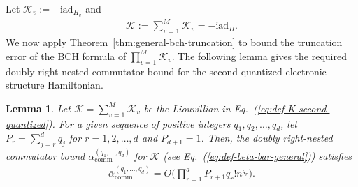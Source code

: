 \documentclass[11pt]{article}
\newtheorem{lemma}{Lemma}
\newcommand{\eq}[1]{(\ref{eq:#1})}
\newcommand{\thm}[1]{\hyperref[thm:#1]{Theorem~\ref*{thm:#1}}}
\renewcommand{\i}{\mathrm{i}}
\newcommand{\ad}{\mathrm{ad}}
\renewcommand{\comm}{\mathrm{comm}}
\newcommand{\mc}{\mathcal}
\begin{document}
Let $\mc{K}_v:=-\i \ad_{H_v}$ and \begin{align}
\label{eq:def-K-second-quantized}
    \mc{K}:= \sum_{v=1}^M  \mc K_v= -\i \ad_H. 
\end{align}
We now apply \thm{general-bch-truncation} to bound the truncation error of the BCH formula of $\prod_{v=1}^M\mc K_v$. The following lemma gives the required doubly right-nested commutator bound for the second-quantized electronic-structure Hamiltonian.
\begin{lemma}
    Let $\mc K = \sum_{v=1}^M \mc K_v$ be the Liouvillian in Eq.~\eq{def-K-second-quantized}. For a given sequence of positive integers $q_1, q_2, \ldots, q_d$, let $P_{r} = \sum_{j=r}^{d} q_j$ for $r=1, 2, \ldots, d$ and $P_{d+1}=1$. Then, the doubly right-nested commutator bound $\bar{\alpha}_{\comm}^{(q_1, \ldots, q_{d})}$ for $\mc K$ (see Eq.~\eq{def-beta-bar-general}) satisfies
    \begin{align}
    \label{eq:double-comm-second-quantized}
        \bar{\alpha}_{\comm}^{(q_1, \ldots, q_{d})}= O\bigg(\prod_{r=1}^{d}P_{r+1} q_r!n^{q_r}\bigg).
    \end{align}
\end{lemma}
\end{document}
